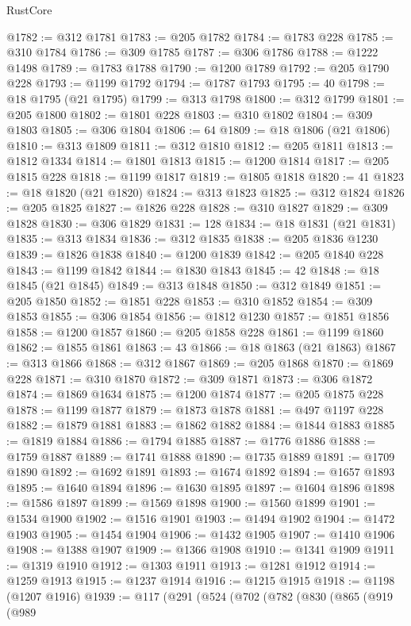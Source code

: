\begin{lexlean}{RustCore}
\begin{coremodule}
@1782 := @312 @1781
@1783 := @205 @1782
@1784 := @1783 @228
@1785 := @310 @1784
@1786 := @309 @1785
@1787 := @306 @1786
@1788 := @1222 @1498
@1789 := @1783 @1788
@1790 := @1200 @1789
@1792 := @205 @1790 @228
@1793 := @1199 @1792
@1794 := @1787 @1793
@1795 := 40
@1798 := @18 @1795 (@21 @1795)
@1799 := @313 @1798
@1800 := @312 @1799
@1801 := @205 @1800
@1802 := @1801 @228
@1803 := @310 @1802
@1804 := @309 @1803
@1805 := @306 @1804
@1806 := 64
@1809 := @18 @1806 (@21 @1806)
@1810 := @313 @1809
@1811 := @312 @1810
@1812 := @205 @1811
@1813 := @1812 @1334
@1814 := @1801 @1813
@1815 := @1200 @1814
@1817 := @205 @1815 @228
@1818 := @1199 @1817
@1819 := @1805 @1818
@1820 := 41
@1823 := @18 @1820 (@21 @1820)
@1824 := @313 @1823
@1825 := @312 @1824
@1826 := @205 @1825
@1827 := @1826 @228
@1828 := @310 @1827
@1829 := @309 @1828
@1830 := @306 @1829
@1831 := 128
@1834 := @18 @1831 (@21 @1831)
@1835 := @313 @1834
@1836 := @312 @1835
@1838 := @205 @1836 @1230
@1839 := @1826 @1838
@1840 := @1200 @1839
@1842 := @205 @1840 @228
@1843 := @1199 @1842
@1844 := @1830 @1843
@1845 := 42
@1848 := @18 @1845 (@21 @1845)
@1849 := @313 @1848
@1850 := @312 @1849
@1851 := @205 @1850
@1852 := @1851 @228
@1853 := @310 @1852
@1854 := @309 @1853
@1855 := @306 @1854
@1856 := @1812 @1230
@1857 := @1851 @1856
@1858 := @1200 @1857
@1860 := @205 @1858 @228
@1861 := @1199 @1860
@1862 := @1855 @1861
@1863 := 43
@1866 := @18 @1863 (@21 @1863)
@1867 := @313 @1866
@1868 := @312 @1867
@1869 := @205 @1868
@1870 := @1869 @228
@1871 := @310 @1870
@1872 := @309 @1871
@1873 := @306 @1872
@1874 := @1869 @1634
@1875 := @1200 @1874
@1877 := @205 @1875 @228
@1878 := @1199 @1877
@1879 := @1873 @1878
@1881 := @497 @1197 @228
@1882 := @1879 @1881
@1883 := @1862 @1882
@1884 := @1844 @1883
@1885 := @1819 @1884
@1886 := @1794 @1885
@1887 := @1776 @1886
@1888 := @1759 @1887
@1889 := @1741 @1888
@1890 := @1735 @1889
@1891 := @1709 @1890
@1892 := @1692 @1891
@1893 := @1674 @1892
@1894 := @1657 @1893
@1895 := @1640 @1894
@1896 := @1630 @1895
@1897 := @1604 @1896
@1898 := @1586 @1897
@1899 := @1569 @1898
@1900 := @1560 @1899
@1901 := @1534 @1900
@1902 := @1516 @1901
@1903 := @1494 @1902
@1904 := @1472 @1903
@1905 := @1454 @1904
@1906 := @1432 @1905
@1907 := @1410 @1906
@1908 := @1388 @1907
@1909 := @1366 @1908
@1910 := @1341 @1909
@1911 := @1319 @1910
@1912 := @1303 @1911
@1913 := @1281 @1912
@1914 := @1259 @1913
@1915 := @1237 @1914
@1916 := @1215 @1915
@1918 := @1198 (@1207 @1916)
@1939 := @117
    (@291
      (@524
        (@702
          (@782
            (@830
              (@865
                (@919
                  (@989

\end{coremodule}
\end{lexlean}
